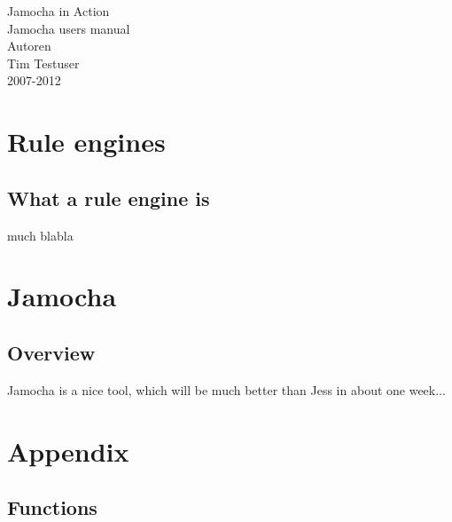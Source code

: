 \documentclass[a4paper,12pt]{scrbook}
\begin{document}
\begin{titlepage}
\begin{center}
\vspace*{4cm}
\Huge Jamocha in Action\\
\vspace{1cm}
\large Jamocha users manual\\
\vspace{1cm}
\normalsize Autoren\\
Tim Testuser\\
\vspace{1cm}
2007-2012\\
\end{center}
\end{titlepage}

\tableofcontents
\newpage

\chapter{Rule engines}

\section{What a rule engine is}
much blabla

\chapter{Jamocha}

\section{Overview}
Jamocha is a nice tool, which will be much better than Jess in about one week...

\chapter{Appendix}

\section{Functions}


\newpage
\printindex
\end{document}
